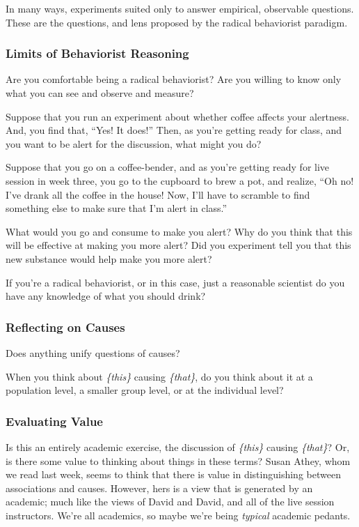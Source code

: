 \documentclass[
]{article}
\begin{document}
In many ways, experiments suited only to answer empirical, observable questions. These are the questions, and lens proposed by the radical behaviorist paradigm.

\hypertarget{limits-of-behaviorist-reasoning}{%
\subsubsection{Limits of Behaviorist Reasoning}\label{limits-of-behaviorist-reasoning}}

Are you comfortable being a radical behaviorist? Are you willing to know only what you can see and observe and measure?

Suppose that you run an experiment about whether coffee affects your alertness. And, you find that, ``Yes! It does!'' Then, as you're getting ready for class, and you want to be alert for the discussion, what might you do?

Suppose that you go on a coffee-bender, and as you're getting ready for live session in week three, you go to the cupboard to brew a pot, and realize, ``Oh no! I've drank all the coffee in the house! Now, I'll have to scramble to find something else to make sure that I'm alert in class.''

What would you go and consume to make you alert? Why do you think that this will be effective at making you more alert? Did you experiment tell you that this new substance would help make you more alert?

If you're a radical behaviorist, or in this case, just a reasonable scientist do you have any knowledge of what you should drink?

\hypertarget{reflecting-on-causes}{%
\subsubsection{Reflecting on Causes}\label{reflecting-on-causes}}

Does anything unify questions of causes?

When you think about \emph{\{this\}} causing \emph{\{that\}}, do you think about it at a population level, a smaller group level, or at the individual level?

\hypertarget{evaluating-value}{%
\subsubsection{Evaluating Value}\label{evaluating-value}}

Is this an entirely academic exercise, the discussion of \emph{\{this\}} causing \emph{\{that\}}? Or, is there some value to thinking about things in these terms? Susan Athey, whom we read last week, seems to think that there is value in distinguishing between associations and causes. However, hers is a view that is generated by an academic; much like the views of David and David, and all of the live session instructors. We're all academics, so maybe we're being \emph{typical} academic pedants.
\end{document}
